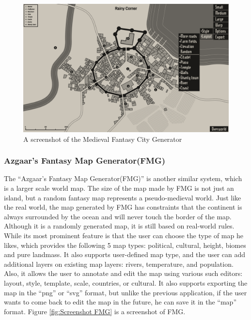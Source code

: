 \begin{figure}[!htb]
\centering
\includegraphics[width=\textwidth]{section01/assets/screenshot_MFCG.png}
\caption[A screenshot of the Medieval Fantasy City Generator]{\label{fig:Screenshot MFCG}A screenshot of the Medieval Fantasy City Generator}
\end{figure}

\subsubsection{Azgaar's Fantasy Map Generator(FMG)}
\label{sec:Introduction>Similar Systems>FMG}
The ``Azgaar's Fantasy Map Generator(FMG)'' is another similar system, which is a larger scale world map. The size of the map made by FMG is not just an island, but a random fantasy map represents a pseudo-medieval world. Just like the real world, the map generated by FMG has constraints that the continent is always surrounded by the ocean and will never touch the border of the map. Although it is a randomly generated map, it is still based on real-world rules. While its most prominent feature is that the user can choose the type of map he likes, which provides the following 5 map types: political, cultural, height, biomes and pure landmass. It also supports user-defined map type, and the user can add additional layers on existing map layers: rivers, temperature, and population. Also, it allows the user to annotate and edit the map using various such editors: layout, style, template, scale, countries, or cultural. It also supports exporting the map in the ``png'' or ``svg'' format, but unlike the previous application, if the user wants to come back to edit the map in the future, he can save it in the ``map'' format. Figure \ref{fig:Screenshot FMG} is a screenshot of FMG.

